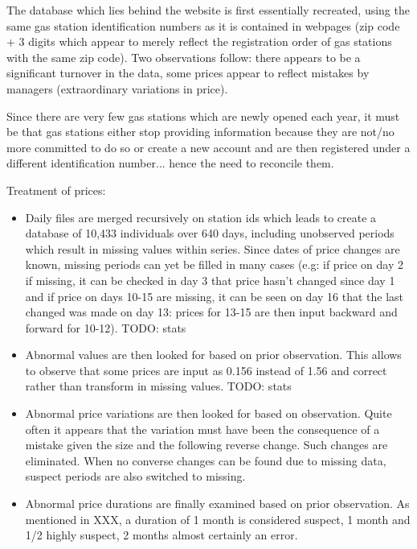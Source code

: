 \documentclass[11pt]{article}
\begin{document}
The database which lies behind the website is first essentially recreated, using the same gas station identification numbers as it is contained in webpages (zip code + 3 digits which appear to merely reflect the registration order of gas stations with the same zip code). Two observations follow: there appears to be a significant turnover in the data, some prices appear to reflect mistakes by managers (extraordinary variations in price).

Since there are very few gas stations which are newly opened each year, it must be that gas stations either stop providing information because they are not/no more committed to do so or create a new account and are then registered under a different identification number... hence the need to reconcile them.

Treatment of prices:
\begin{itemize}
\item Daily files are merged recursively on station ids which leads to create a database of 10,433 individuals over 640 days, including unobserved periods which result in missing values within series. Since dates of price changes are known, missing periods can yet be filled in many cases (e.g: if price on day 2 if missing, it can be checked in day 3 that price hasn't changed since day 1 and if price on days 10-15 are missing, it can be seen on day 16 that the last changed was made on day 13: prices for 13-15 are then input backward and forward for 10-12). TODO: stats
\item Abnormal values are then looked for based on prior observation. This allows to observe that some prices are input as 0.156 instead of 1.56 and correct rather than transform in missing values. TODO: stats
\item Abnormal price variations are then looked for based on observation. Quite often it appears that the variation must have been the consequence of a mistake given the size and the following reverse change. Such changes are eliminated. When no converse changes can be found due to missing data, suspect periods are also switched to missing.
\item Abnormal price durations are finally examined based on prior observation. As mentioned in XXX, a duration of 1 month is considered suspect, 1 month and 1/2 highly suspect, 2 months almost certainly an error.
\end{itemize}
\end{document}

